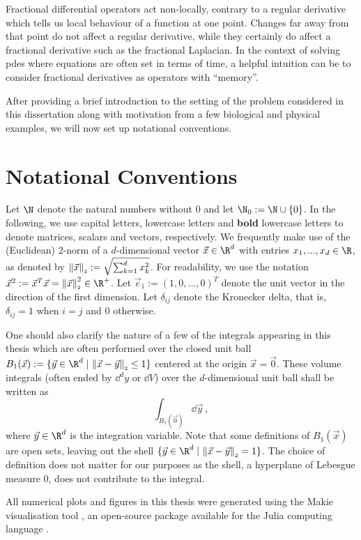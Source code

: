 Fractional differential operators act non-locally, contrary to a regular derivative which tells us local behaviour of a function at one point.
Changes far away from that point do not affect a regular derivative, while they certainly do affect a fractional derivative such as the fractional Laplacian.
In the context of solving \gls{pdes} where equations are often set in terms of time, a helpful intuition can be to consider fractional derivatives as operators with ``memory''.

After providing a brief introduction to the setting of the problem considered in this dissertation along with motivation from a few biological and physical examples, we will now set up notational conventions.

\section{Notational Conventions}
Let $\N$ denote the natural numbers without $0$ and let $\N_0 := \N \cup \{0\}$.
In the following, we use capital letters, lowercase letters and \textbf{bold} lowercase letters to denote matrices, scalars and vectors, respectively.
We frequently make use of the (Euclidean) 2-norm of a $d$-dimensional vector $\vec{x} \in \R^d$ with entries $x_1, ..., x_d \in \R$, as denoted by $\left\lVert\vec{x}\right\rVert_{\scriptscriptstyle 2} := \sqrt{\sum_{k=1}^d x_k^2}$.
For readability, we use the notation $\vec{x}^2 := \vec{x}^T \vec{x} = \norm{\vec{x}}^2 \in \R^+$.
Let $\vec{e}_1 := (1, 0, ..., 0)^T$ denote the unit vector in the direction of the first dimension.
Let $\delta_{ij}$ denote the Kronecker delta, that is, $\delta_{ij} = 1$ when $i=j$ and $0$ otherwise.

One should also clarify the nature of a few of the integrals appearing in this thesis which are often performed over the closed unit ball $B_1(\vec{x}) := \{\vec{y} \in \R^d \;|\, \norm{\vec{x} - \vec{y}} \le 1\}$ centered at the origin $\vec{x} = \vec{0}$.
These volume integrals (often ended by $\dd^d y$ or $\dd V$) over the $d$-dimensional unit ball shall be written as
$$\int_{B_1(\vec{0})} \dd\vec{y}\,,$$
where $\vec{y} \in \R^d$ is the integration variable.
Note that some definitions of $B_1(\vec{x})$ are open sets, leaving out the shell $\{\vec{y} \in \R^d \;|\, \norm{\vec{x} - \vec{y}} = 1\}$.
The choice of definition does not matter for our purposes as the shell, a hyperplane of Lebesgue measure $0$, does not contribute to the integral.

All numerical plots and figures in this thesis were generated using the Makie visualisation tool \parencite{2021-makie}, an open-source package available for the Julia computing language \parencite{2017-julia}.
